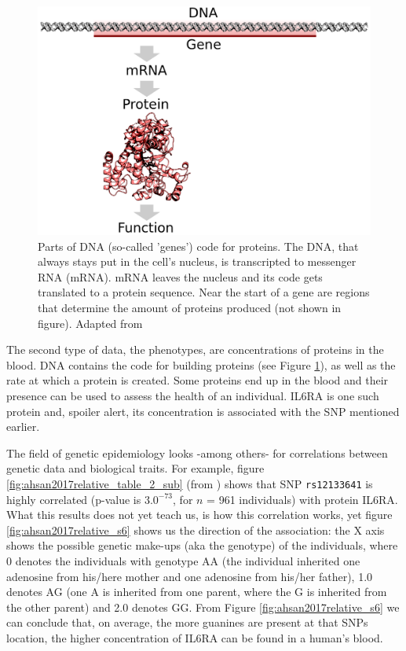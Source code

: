 \begin{figure}[!htbp]
  \centering
  \includegraphics[width=\linewidth]{DNA_to_protein.png}
  \caption{
    Parts of DNA (so-called 'genes') code for proteins. 
    The DNA, that always stays put in the cell's nucleus, 
    is transcripted to messenger RNA (mRNA).
    mRNA leaves the nucleus and its code gets translated to 
    a protein sequence.
    Near the start of a gene are regions that determine the amount
    of proteins produced (not shown in figure).
    Adapted from \cite{shafee2015}
  }
  \label{fig:dna_to_protein}
\end{figure}

The second type of data, the phenotypes, 
are concentrations of proteins in the blood. 
DNA contains the code for building proteins (see Figure 
\ref{fig:dna_to_protein}), 
as well as the rate
at which a protein is created. Some proteins end up in the blood and
their presence can be used to assess the health of an individual.
IL6RA is one such protein and, spoiler alert, its concentration
is associated with the SNP mentioned earlier.

The field of genetic epidemiology looks -among others- for
correlations between genetic data and biological traits.
For example, figure \ref{fig:ahsan2017relative_table_2_sub} 
(from \cite{ahsan2017relative}) shows that
SNP \verb|rs12133641| is highly correlated (p-value is $3.0^{-73}$, 
for $n$ = 961 individuals) with protein IL6RA. What this results does
not yet teach us, is how this correlation works, yet
figure \ref{fig:ahsan2017relative_s6} shows us the direction of the association:
the X axis shows the possible genetic make-ups (aka the genotype) of the individuals,
where 0 denotes the individuals with genotype
AA (the individual inherited one adenosine 
from his/here mother and one adenosine from his/her father), 
1.0 denotes AG (one A is inherited from one parent, 
where the G is inherited from the other parent) and 2.0 denotes GG.
From Figure \ref{fig:ahsan2017relative_s6} we can conclude that, on average,
the more guanines are present at that SNPs location,
the higher concentration of IL6RA can be found in a human's blood.

